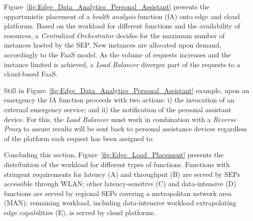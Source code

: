 


Figure~\ref{fig:Edge_Data_Analytics_Personal_Assistant} presents the opportunistic placement of a \textit{health analysis} function (fA) onto edge and cloud platforms. Based on the workload for different functions and the availability of resources, a \textit{Centralized Orchestrator} decides for the maximum number of instances hosted by the SEP.
New instances are allocated upon demand, accordingly to the FaaS model. As the volume of requests increases and the instance limited is achieved, a \textit{Load Balancer} diverges part of the requests to a cloud-based FaaS.

Still in Figure~\ref{fig:Edge_Data_Analytics_Personal_Assistant} example, upon an emergency the fA function proceeds with two actions: i) the invocation of an external emergency service; and ii) the notification of the personal assistant device. For this, the \textit{Load Balancer} must work in combination with a \textit{Reverse Proxy} to assure results will be sent back to personal assistance devices regardless of the platform each request has been assigned to.

Concluding this section, Figure~\ref{fig:Edge_Load_Placement} presents the distribution of the workload for different types of functions. Functions with stringent requirements for latency (A) and throughput (B) are served by SEPs accessible through WLAN; other latency-sensitive (C) and data-intensive (D) functions are served by regional SEPs covering a metropolitan network area (MAN); remaining workload, including data-intensive workload extrapolating edge capabilities (E), is served by cloud platforms. 

